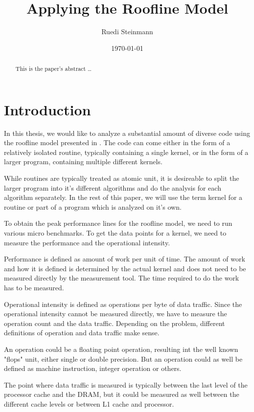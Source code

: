 \documentclass[a4paper,12pt]{article}
\title{Applying the Roofline Model}
\author{Ruedi Steinmann}
\date{\today}
\begin{document}
\maketitle

\begin{abstract}
This is the paper's abstract \ldots
\end{abstract}

\tableofcontents

\section{Introduction}
In this thesis, we would like to analyze a substantial amount of diverse code using the roofline model presented in \cite{Roofline}. The code can come either in the form of a relatively isolated routine, typically containing a single kernel, or in the form of a larger program, containing multiple different kernels.

While routines are typically treated as atomic unit, it is desireable to split the larger program into it's different algorithms and do the analysis for each algorithm separately. In the rest of this paper, we will use the term kernel for a routine or part of a program which is analyzed on it's own.

To obtain the peak performance lines for the roofline model, we need to run various micro benchmarks. To get the data points for a kernel, we need to measure the performance and the operational intensity. 

Performance is defined as amount of work per unit of time. The amount of work and how it is defined is determined by the actual kernel and does not need to be measured directly by the measurement tool. The time required to do the work has to be measured.

Operational intensity is defined as operations per byte of data traffic. Since the operational intensity cannot be measured directly, we have to measure the operation count and the data traffic. Depending on the problem, different definitions of operation and data traffic make sense.

An operation could be a floating point operation, resulting int the well known "flops" unit, either single or double precision. But an operation could as well be defined as machine instruction, integer operation or others.

The point where data traffic is measured is typically between the last level of the processor cache and the DRAM, but it could be measured as well between the different cache levels or between L1 cache and processor.
\end{document}
